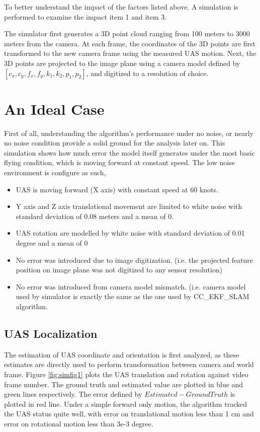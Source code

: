 To better understand the impact of the factors listed above. A 
simulation is performed to examine the impact item 1 and item 3. 

The simulator first generates a 3D point cloud ranging from 100 meters 
to 3000 meters from the camera. At each frame, the coordinates of the 3D 
points are first transformed to the new camera frame using the measured 
UAS motion. Next, the 3D points are projected to the image plane using a 
camera model defined by $[c_{x}, c_{y}, f_{x}, f_{y}, k_{1}, k_{2}, 
p_{1}, p_{2}]$, and digitized to a resolution of choice. 

\section{An Ideal Case}
First of all, understanding the algorithm's performance under no noise, 
or nearly no noise condition provide a solid ground for the analysis 
later on. This simulation shows how much error the model itself 
generates under the most basic flying condition, which is moving forward 
at constant speed. The low noise environment is configure as such,

\begin{itemize}
  \item UAS is moving forward (X axis) with constant speed at 60 knots. 
  \item Y axis and Z axis translational movement are limited to white
  noise with standard deviation of 0.08 meters and a mean of 0.
  \item UAS rotation are modelled by white noise with standard
  deviation of 0.01 degree and a mean of 0
  \item No error was introduced due to image digitization. (i.e. the
  projected feature position on image plane was not digitized to any
  sensor resolution)
  \item No error was introduced from camera model mismatch. (i.e.
  camera model used by simulator is exactly the same as the one used
  by CC\_EKF\_SLAM algorithm.
\end{itemize}

\subsection{UAS Localization}
The estimation of UAS coordinate and orientation is first analyzed, as 
these estimates are directly used to perform transformation between 
camera and world frame. Figure \ref{fig:simfig1} plots the UAS 
translation and rotation against video frame number. The ground truth 
and estimated value are plotted in blue and green lines respectively. 
The error defined by $Estimated-Ground Truth$ is plotted in red line. 
Under a simple forward only motion, the algorithm tracked the UAS status 
quite well, with error on translational motion less than 1 cm and error 
on rotational motion less than 3e-3 degree. 

